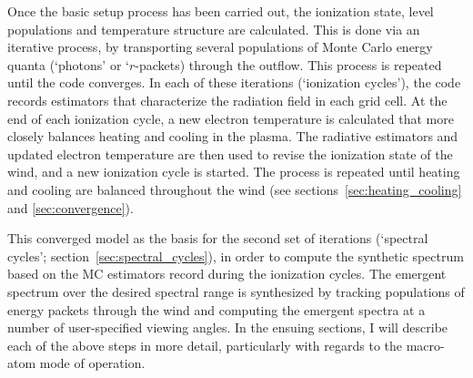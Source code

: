 Once the basic setup process has been carried out, the ionization state,
level populations and temperature structure are calculated.
This is done via an iterative process, by transporting several populations of 
Monte Carlo energy quanta (`photons' or `$r$-packets) through the outflow.
This process is repeated until the code converges. 
In each of these iterations (`ionization cycles'), the code records estimators that 
characterize the radiation field in each grid cell. At the end 
of each ionization cycle, a new electron temperature is calculated
that more closely balances heating and cooling in the 
plasma. The radiative estimators and updated electron
temperature are then used to revise the ionization state of the wind,
and a new ionization cycle is started. The process is repeated until
heating and cooling are balanced throughout the wind (see sections~\ref{sec:heating_cooling}
and \ref{sec:convergence}). 

This converged model as the basis for the second set of
iterations (`spectral cycles'; section~\ref{sec:spectral_cycles}), 
in order to compute the synthetic spectrum based on the 
MC estimators record during the ionization cycles. 
The emergent spectrum over the desired spectral range is synthesized by 
tracking populations of energy packets through the wind and computing the emergent spectra at
a number of user-specified viewing angles.  In the ensuing sections,
I will describe each of the above steps in more detail, particularly
with regards to the macro-atom mode of operation.


